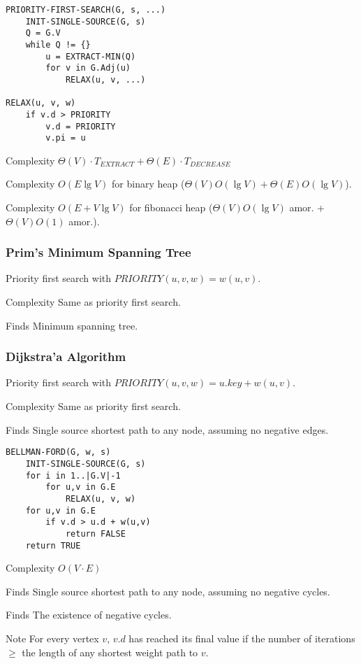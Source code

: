 \documentclass[10pt, a4paper,landscape]{article}
\begin{document}
\begin{multicols*}{4}
\begin{lstlisting}
PRIORITY-FIRST-SEARCH(G, s, ...)
    INIT-SINGLE-SOURCE(G, s)
    Q = G.V
    while Q != {}
        u = EXTRACT-MIN(Q)
        for v in G.Adj(u)
            RELAX(u, v, ...)

RELAX(u, v, w)
    if v.d > PRIORITY
        v.d = PRIORITY
        v.pi = u
\end{lstlisting}
\begin{compactitem}
    \item[Complexity] $\Theta(V)\cdot T_{EXTRACT} + \Theta(E)\cdot T_{DECREASE}$
    \item[Complexity] $O(E\lg{V})$ for binary heap ($\Theta(V) O(\lg V) + \Theta(E) O(\lg V)$).
    \item[Complexity] $O(E + V\lg{V})$ for fibonacci heap ($\Theta(V) O(\lg V)$ amor. + $\Theta(V) O(1)$ amor.).
\end{compactitem}

\subsubsection{Prim's Minimum Spanning Tree}
Priority first search with $PRIORITY(u, v, w) = w(u, v)$.
\begin{compactitem}
    \item[Complexity] Same as priority first search.
    \item[Finds] Minimum spanning tree.
\end{compactitem}

\subsubsection{Dijkstra'a Algorithm}
Priority first search with $PRIORITY(u, v, w) = u.key + w(u, v)$.
\begin{compactitem}
    \item[Complexity] Same as priority first search.
    \item[Finds] Single source shortest path to any node, assuming no negative edges.
\end{compactitem}

\begin{lstlisting}
BELLMAN-FORD(G, w, s)
    INIT-SINGLE-SOURCE(G, s)
    for i in 1..|G.V|-1
        for u,v in G.E
            RELAX(u, v, w)
    for u,v in G.E
        if v.d > u.d + w(u,v)
            return FALSE
    return TRUE
\end{lstlisting}

\begin{compactitem}
    \item[Complexity] $O(V\cdot E)$
    \item[Finds] Single source shortest path to any node, assuming no negative cycles.
    \item[Finds] The existence of negative cycles.
    \item[Note] For every vertex $v$, $v.d$ has reached its final value if the number of iterations $\geq$ the length of any shortest weight path to $v$.
\end{compactitem}


\end{multicols*}
\end{document}
